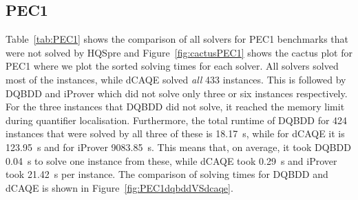\documentclass[
  digital, %
  color,
  twoside, %
  table,   %
  nolof,     %
  nolot,     %
]{fithesis3}
\theoremstyle{definition}
\theoremstyle{remark}
\begin{document}
%

\subsection{PEC1}
Table~\ref{tab:PEC1} shows the comparison of all solvers for PEC1 benchmarks that were not solved by HQSpre and Figure~\ref{fig:cactusPEC1} shows the cactus plot for PEC1 where we plot the sorted solving times for each solver. All solvers solved most of the instances, while dCAQE solved \emph{all} 433 instances. This is followed by DQBDD and iProver which did not solve only three or six instances respectively. For the three instances that DQBDD did not solve, it reached the memory limit during quantifier localisation. Furthermore, the total runtime of DQBDD for 424 instances that were solved by all three of these is \SI{18.17}{s}, while for dCAQE it is \SI{123.95}{s} and for iProver \SI{9083.85}{s}. This means that, on average, it took DQBDD \SI{0.04}{s} to solve one instance from these, while dCAQE took \SI{0.29}{s} and iProver took \SI{21.42}{s} per instance. The comparison of solving times for DQBDD and dCAQE is shown in Figure~\ref{fig:PEC1dqbddVSdcaqe}.
\end{document}
